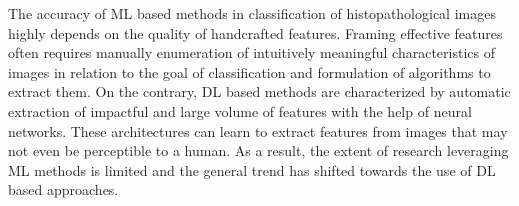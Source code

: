 \documentclass{comjnl}
\begin{document}
The accuracy of ML based methods in classification of histopathological images highly depends on the quality of handcrafted features. Framing effective features often requires manually enumeration of intuitively meaningful characteristics of images in relation to the goal of classification and formulation of algorithms to extract them. On the contrary, DL based methods are characterized by automatic extraction of impactful and large volume of features with the help of neural networks. These architectures can learn to extract features from images that may not even be perceptible to a human. As a result, the extent of research leveraging ML methods is limited and the general trend has shifted towards the use of DL based approaches. 

\end{document}
